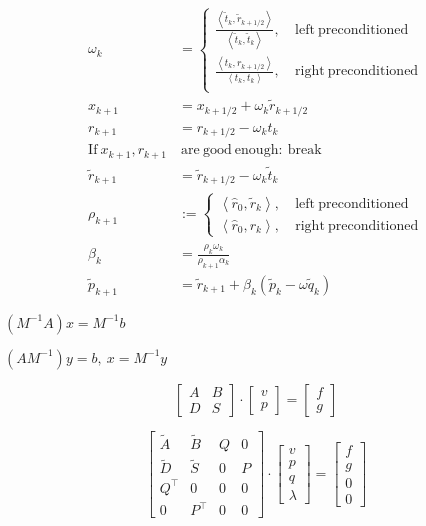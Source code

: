 \documentclass{article}
\begin{document}
\begin{align*}
  \omega_k& =
  \begin{cases}
    \frac{\left< \tilde{t}_k, \tilde{r}_{k+1/2} \right>}{\left< \tilde{t}_k, \tilde{t}_k \right>},
    & \mathrm{~left~preconditioned} \\
    \frac{\left< t_k, r_{k+1/2} \right>}{\left< t_k, t_k \right>}, & \mathrm{~right~preconditioned} \\
  \end{cases}\\
  x_{k+1} & = x_{k+1/2} + \omega_k \tilde{r}_{k+1/2} \\
  r_{k+1} & = r_{k+1/2} - \omega_k t_{k} \\
  \mathrm{If~} x_{k+1}, r_{k+1} & \mathrm{~are~good~enough:~break}\\
  \tilde{r}_{k+1} & = \tilde{r}_{k+1/2} - \omega_k \tilde{t}_{k} \\
  \rho_{k+1} & :=
  \begin{cases}
    \left< \hat{r}_0, \tilde{r}_k \right>, & \mathrm{~left~preconditioned} \\
    \left< \hat{r}_0, r_k \right>, & \mathrm{~right~preconditioned}
  \end{cases}\\
  \beta_k & = \frac{\rho_k \omega_k}{\rho_{k+1} \alpha_k} \\
  \tilde{p}_{k+1} & = \tilde{r}_{k+1} + \beta_k (\tilde{p}_k - \omega \tilde{q}_k)
\end{align*}
\pagebreak

$(M^{-1}A)x = M^{-1}b$
\pagebreak

$(AM^{-1})y = b,~x=M^{-1}y$
\pagebreak

\[ \begin{bmatrix} A & B\\D & S \end{bmatrix} \cdot \begin{bmatrix}v\\p\end{bmatrix} = \begin{bmatrix}f\\g\end{bmatrix}\]
\pagebreak

\[ \begin{bmatrix} \tilde{A} & \tilde{B} & Q & 0\\\tilde{D} & \tilde{S} & 0 & P\\Q^\top & 0 & 0 & 0\\0 & P^\top & 0 & 0 \end{bmatrix}
\cdot \begin{bmatrix}v\\p\\q\\\lambda\end{bmatrix} = \begin{bmatrix}f\\g\\0\\0\end{bmatrix}\]
\pagebreak
\end{document}
